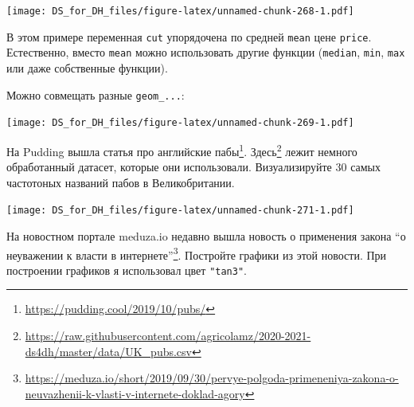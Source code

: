 \documentclass[
]{book}
\makeatletter
\newenvironment{Shaded}{\begin{snugshade}}{\end{snugshade}}
\newcommand{\DataTypeTok}[1]{\textcolor[rgb]{0.13,0.29,0.53}{#1}}
\newcommand{\DecValTok}[1]{\textcolor[rgb]{0.00,0.00,0.81}{#1}}
\newcommand{\KeywordTok}[1]{\textcolor[rgb]{0.13,0.29,0.53}{\textbf{#1}}}
\newcommand{\NormalTok}[1]{#1}
\newcommand{\OperatorTok}[1]{\textcolor[rgb]{0.81,0.36,0.00}{\textbf{#1}}}
\newcommand{\StringTok}[1]{\textcolor[rgb]{0.31,0.60,0.02}{#1}}
\renewcommand{\href}[2]{#2\footnote{\url{#1}}}
\newenvironment{kframe}{%
    \medskip{}
    \setlength{\fboxsep}{.8em}
    \def\at@end@of@kframe{}%
    \ifinner\ifhmode%
    \def\at@end@of@kframe{\end{minipage}}%
    \begin{minipage}{\columnwidth}%
    \fi\fi%
    \def\FrameCommand##1{\hskip\@totalleftmargin \hskip-\fboxsep
    \colorbox{shadecolor}{##1}\hskip-\fboxsep
        \hskip-\linewidth \hskip-\@totalleftmargin \hskip\columnwidth}%
    \MakeFramed {\advance\hsize-\width
      \@totalleftmargin\z@ \linewidth\hsize
      \@setminipage}}%
  {\par\unskip\endMakeFramed%
    \at@end@of@kframe}
\newenvironment{rmdblock}[1]
  {
    \begin{itemize}
    \renewcommand{\labelitemi}{
      \raisebox{-.7\height}[0pt][0pt]{
        {\setkeys{Gin}{width=3em,keepaspectratio}\texttt{[image: images/\#1]}}
        }
        }
        \setlength{\fboxsep}{1em}
        \begin{kframe}
        \item
      }
      {
        \end{kframe}
        \end{itemize}
      }
\newenvironment{rmdtask}
      {\begin{rmdblock}{task}}
      {\end{rmdblock}}
\makeatother
\begin{document}
\texttt{[image: DS\_for\_DH\_files/figure-latex/unnamed-chunk-268-1.pdf]}

В этом примере переменная \texttt{cut} упорядочена по средней \texttt{mean} цене \texttt{price}. Естественно, вместо \texttt{mean} можно использовать другие функции (\texttt{median}, \texttt{min}, \texttt{max} или даже собственные функции).

Можно совмещать разные \texttt{geom\_...}:

\begin{Shaded}
\end{Shaded}

\texttt{[image: DS\_for\_DH\_files/figure-latex/unnamed-chunk-269-1.pdf]}

\begin{rmdtask}
На Pudding вышла \href{https://pudding.cool/2019/10/pubs/}{статья про
английские пабы}.
\href{https://raw.githubusercontent.com/agricolamz/2020-2021-ds4dh/master/data/UK_pubs.csv}{Здесь}
лежит немного обработанный датасет, которые они использовали.
Визуализируйте 30 самых частотоных названий пабов в Великобритании.
\end{rmdtask}

\texttt{[image: DS\_for\_DH\_files/figure-latex/unnamed-chunk-271-1.pdf]}

\begin{rmdtask}
На новостном портале meduza.io недавно вышла
\href{https://meduza.io/short/2019/09/30/pervye-polgoda-primeneniya-zakona-o-neuvazhenii-k-vlasti-v-internete-doklad-agory}{новость
о применения закона ``о неуважении к власти в интернете''}. Постройте
графики из этой новости. При построении графиков я использовал цвет
\texttt{"tan3"}.
\end{rmdtask}
\end{document}
